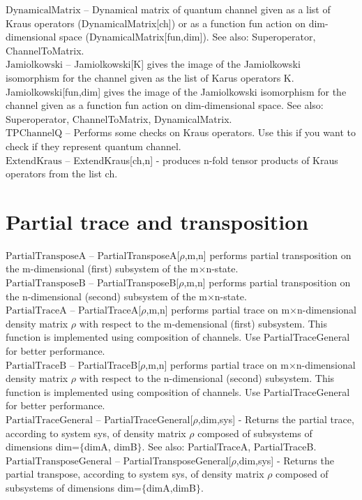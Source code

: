 \documentclass[a4paper,10pt]{scrartcl}
\begin{document}
\noindent\textbf{$ \text{DynamicalMatrix} $ }-- Dynamical matrix of quantum channel given as a list of Kraus operators (DynamicalMatrix[ch]) or as a function fun action on dim-dimensional space (DynamicalMatrix[fun,dim]). See also: Superoperator, ChannelToMatrix.$  $\\[8pt]
\noindent\textbf{$ \text{Jamiolkowski} $ }-- Jamiolkowski[K] gives the image of the Jamiolkowski isomorphism for the channel given as the list of Karus operators K. Jamiolkowski[fun,dim] gives the image of the Jamiolkowski isomorphism for the channel given as a function fun action on dim-dimensional space. See also: Superoperator, ChannelToMatrix, DynamicalMatrix.$  $\\[8pt]
\noindent\textbf{$ \text{TPChannelQ} $ }-- Performs some checks on Kraus operators. Use this if you want to check if they represent quantum channel.$  $\\[8pt]
\noindent\textbf{$ \text{ExtendKraus} $ }-- ExtendKraus[ch,n] - produces n-fold tensor products of Kraus operators from the list ch.$  $\\[8pt]
\section{Partial trace and transposition}

\noindent\textbf{$ \text{PartialTransposeA} $ }-- PartialTransposeA[$\rho $,m,n] performs partial transposition on the m-dimensional (first) subsystem of the m$\times $n-state.$  $\\[8pt]
\noindent\textbf{$ \text{PartialTransposeB} $ }-- PartialTransposeB[$\rho $,m,n] performs partial transposition on the n-dimensional (second) subsystem of the m$\times $n-state.$  $\\[8pt]
\noindent\textbf{$ \text{PartialTraceA} $ }-- PartialTraceA[$\rho $,m,n] performs partial trace on m$\times $n-dimensional density matrix $\rho $ with respect to the m-demensional (first) subsystem. This function is implemented using composition of channels. Use PartialTraceGeneral for better performance.$  $\\[8pt]
\noindent\textbf{$ \text{PartialTraceB} $ }-- PartialTraceB[$\rho $,m,n] performs partial trace on m$\times $n-dimensional density matrix $\rho $ with respect to the n-dimensional (second) subsystem. This function is implemented using composition of channels. Use PartialTraceGeneral for better performance.$  $\\[8pt]
\noindent\textbf{$ \text{PartialTraceGeneral} $ }-- PartialTraceGeneral[$\rho $,dim,sys] - Returns the partial trace, according to system sys, of density matrix $\rho $ composed of subsystems of dimensions dim=$\{$dimA, dimB$\}$. See also: PartialTraceA, PartialTraceB.$  $\\[8pt]
\noindent\textbf{$ \text{PartialTransposeGeneral} $ }-- PartialTransposeGeneral[$\rho $,dim,sys] - Returns the partial transpose, according to system sys, of density matrix $\rho $ composed of subsystems of dimensions dim=$\{$dimA,dimB$\}$. $  $\\[8pt]
\end{document}
